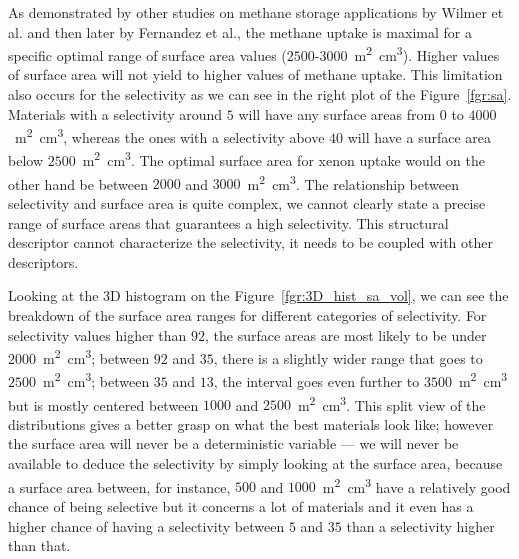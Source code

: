 \documentclass[main.tex]{subfiles}
\begin{document}
As demonstrated by other studies on methane storage applications by Wilmer et al.\autocite{Wilmer_2012} and then later by Fernandez et al.\autocite{Fernandez_2013}, the methane uptake is maximal for a specific optimal range of surface area values ($2500$-$3000$~\si{\square\meter\cubic\centi\meter}). Higher values of surface area will not yield to higher values of methane uptake. This limitation also occurs for the selectivity as we can see in the right plot of the Figure~\ref{fgr:sa}. Materials with a selectivity around $5$ will have any surface areas from $0$ to $4000$~\si{\square\meter\cubic\centi\meter}, whereas the ones with a selectivity above $40$ will have a surface area below $2500$~\si{\square\meter\cubic\centi\meter}. The optimal surface area for xenon uptake would on the other hand be between $2000$ and $3000$~\si{\square\meter\cubic\centi\meter}. The relationship between selectivity and surface area is quite complex, we cannot clearly state a precise range of surface areas that guarantees a high selectivity. This structural descriptor cannot characterize the selectivity, it needs to be coupled with other descriptors. 

Looking at the 3D histogram on the Figure~\ref{fgr:3D_hist_sa_vol}, we can see the breakdown of the surface area ranges for different categories of selectivity. For selectivity values higher than $92$, the surface areas are most likely to be under $2000$~\si{\square\meter\cubic\centi\meter}; between $92$ and $35$, there is a slightly wider range that goes to $2500$~\si{\square\meter\cubic\centi\meter}; between $35$ and $13$, the interval goes even further to $3500$~\si{\square\meter\cubic\centi\meter} but is mostly centered between $1000$ and $2500$~\si{\square\meter\cubic\centi\meter}. This split view of the distributions gives a better grasp on what the best materials look like; however the surface area will never be a deterministic variable --- we will never be available to deduce the selectivity by simply looking at the surface area, because a surface area between, for instance, $500$ and $1000$~\si{\square\meter\cubic\centi\meter} have a relatively good chance of being selective but it concerns a lot of materials and it even has a higher chance of having a selectivity between $5$ and $35$ than a selectivity higher than that. 
\end{document}
